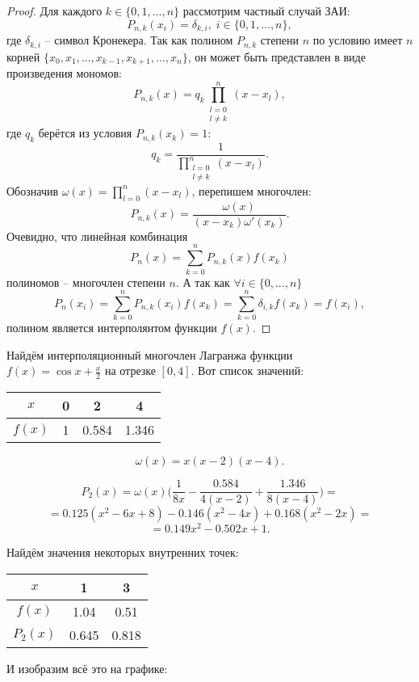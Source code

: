 \documentclass[../main.tex]{subfile}
\begin{document}
\begin{proof}
	Для каждого $k\in\{0,1,...,n\}$ рассмотрим частный случай ЗАИ:
	\[P_{n,k}(x_i)=\delta_{k,i},\;i\in\{0,1,...,n\},\]
	где $\delta_{k,i}$ -- символ Кронекера. Так как полином $P_{n,k}$
	степени $n$ по условию имеет $n$ корней $\{x_0, x_1, ..., x_{k-1},
	x_{k+1}, ..., x_n\}$, он может быть представлен в виде произведения
	мономов:
	\[P_{n,k}(x)=q_k\prod_{\substack{l=0\\ l\neq k}}^{n}(x-x_l),\]
	где $q_k$ берётся из условия $P_{n,k}(x_k)=1$:
	\[q_k=\frac{1}{\prod_{\substack{l=0\\ l\neq k}}^{n}(x-x_l)}.\]
	Обозначив $\omega(x)=\prod_{l=0}^{n}(x-x_l)$, перепишем многочлен:
	\[P_{n,k}(x)=\frac{\omega(x)}{(x-x_k)\omega'(x_k)}.\]
	Очевидно, что линейная комбинация
	\[P_n(x)=\sum_{k=0}^{n}P_{n,k}(x)f(x_k)\]
	полиномов -- многочлен степени $n$. А так как $\forall i\in\{0,...,n\}$
	\[P_n(x_i)=\sum_{k=0}^{n}P_{n,k}(x_i)f(x_k)=\sum_{k=0}^{n}\delta_{i,k}
	f(x_k)=f(x_i),\]
	полином является интерполянтом функции $f(x)$.
\end{proof}

\begin{example}
	Найдём интерполяционный многочлен Лагранжа функции \\ $f(x)=\cos x +
	\frac{x}{2}$ на отрезке $[0,4]$. Вот список значений:\newline

	\begin{tabular}{*{4}{|c}|}
		\hline
		$x$	& 0	& 2	& 4	\\
		\hline
		$f(x)$	& 1	& 0.584	& 1.346	\\
		\hline
	\end{tabular}

	\[\omega(x)=x(x-2)(x-4).\]

	\[P_2(x)=\omega(x)\Big (\frac{1}{8x}-\frac{0.584}{4(x-2)}
	+\frac{1.346}{8(x-4)} \Big )=\]
	\[=0.125(x^2-6x+8)-0.146(x^2-4x)+0.168(x^2-2x)=\]
	\[=0.149x^2-0.502x+1.\]
	\newpage

	Найдём значения некоторых внутренних точек:\newline

	\begin{tabular}{*{3}{|c}|}
		\hline
		$x$     & 1     & 3     \\
		\hline
		$f(x)$  & 1.04	& 0.51	\\
		\hline
		$P_2(x)$& 0.645	& 0.818	\\
		\hline
	\end{tabular}
	\leavevmode\newline

	И изобразим всё это на графике:
	\newline

	

\end{example}
\end{document}
